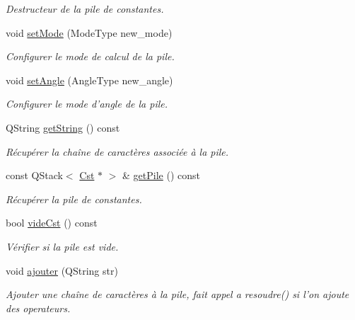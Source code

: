 \begin{DoxyCompactItemize}
\begin{DoxyCompactList}\small\item\em Destructeur de la pile de constantes. \end{DoxyCompactList}\item 
void \hyperlink{classcalcul_1_1_pile_cst_a7b4bff3fb4025a773adb6eb5a76d7835}{set\-Mode} (Mode\-Type new\-\_\-mode)
\begin{DoxyCompactList}\small\item\em Configurer le mode de calcul de la pile. \end{DoxyCompactList}\item 
void \hyperlink{classcalcul_1_1_pile_cst_adff97011a52d468cdefbe34fce28bb14}{set\-Angle} (Angle\-Type new\-\_\-angle)
\begin{DoxyCompactList}\small\item\em Configurer le mode d'angle de la pile. \end{DoxyCompactList}\item 
Q\-String \hyperlink{classcalcul_1_1_pile_cst_a6db73772c41a3ec56683563cd5734a1f}{get\-String} () const 
\begin{DoxyCompactList}\small\item\em Récupérer la chaîne de caractères associée à la pile. \end{DoxyCompactList}\item 
const Q\-Stack$<$ \hyperlink{classcalcul_1_1_cst}{Cst} $\ast$ $>$ \& \hyperlink{classcalcul_1_1_pile_cst_a464aa7bf622f538756f39014686fcda8}{get\-Pile} () const 
\begin{DoxyCompactList}\small\item\em Récupérer la pile de constantes. \end{DoxyCompactList}\item 
bool \hyperlink{classcalcul_1_1_pile_cst_a1e0258011489a1887020d6f89d0f7726}{vide\-Cst} () const 
\begin{DoxyCompactList}\small\item\em Vérifier si la pile est vide. \end{DoxyCompactList}\item 
void \hyperlink{classcalcul_1_1_pile_cst_a5709199aa15152382a8fc27d6c54bfb2}{ajouter} (Q\-String str)
\begin{DoxyCompactList}\small\item\em Ajouter une chaîne de caractères à la pile, fait appel a resoudre() si l'on ajoute des operateurs. \end{DoxyCompactList}\item 

\end{DoxyCompactItemize}
